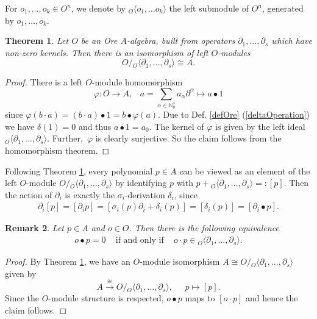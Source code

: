 \documentclass[a4paper,10pt]{article}
\newtheorem{Th}{Theorem}[section]
\newtheorem{remark}[Th]{Remark}
\theoremstyle{nonumberplain}
\newtheorem{proof}{Proof}
\newcommand{\N}{\mathbb{N}}
\begin{document}
For $o_1, \dots, o_k \in O^{n}$, we denote by ${}_O \langle o_1, \dots o_k \rangle$ the left submodule of $O^n$, generated by $o_1, \dots, o_k$.
\begin{Th}\label{IsoOrePoly}
Let $O$ be an Ore $A$-algebra, built from operators $\partial_1, \dots, \partial_s$ which have non-zero kernels. Then there is an isomorphism of left $O$-modules 
$$ O/ {}_O \langle \partial_1, \dots, \partial_s \rangle \cong A. $$
\end{Th}
\begin{proof}
There is a left $O$-module homomorphism 
$$
\varphi : O \rightarrow A, \;\;\; a=\sum_{\alpha \in \N_0^s} a_{\alpha} \partial^\alpha \mapsto a \bullet 1 
$$
since $\varphi(b\cdot a) = (b\cdot a) \bullet 1= b\bullet \varphi(a)$. 
Due to Def. \ref{defOre} (\ref{deltaOperation}) we have $\delta(1)=0$ and thus $a \bullet 1=a_0$. 
The kernel of $\varphi$ is given by the left ideal 
${}_{O} \langle \partial_1, \dots, \partial_s \rangle $. Further,~$\varphi$ 
is clearly surjective. So the claim follows from the homomorphism theorem. 
\end{proof}

Following Theorem \ref{IsoOrePoly}, every polynomial $p \in A$ can be 
viewed as an element of the left $O$-module 
$O / {}_O \langle \partial_1, \dots, \partial_s \rangle$ by identifying 
$p$ with $p + {}_{O} \langle \partial_1, \dots, \partial_s \rangle=:[p]$. Then the 
action of $\partial_i$ is exactly the $\sigma_i$-derivation $\delta_i$, since 
\begin{eqnarray*}
\partial_i [p] = [ \partial_i p] = [ \sigma_i(p) \partial_i + \delta_i(p)] = 
[\delta_i(p)] = [\partial_i \bullet p].
\end{eqnarray*}

\begin{remark}\label{ann}
Let $p \in A$ and $o \in O$. Then there is the following equivalence
\begin{eqnarray*} 
o \bullet p =0 \;\;\; \mbox{ if and only if } \;\;\; 
o \cdot p \in {}_{O} \langle \partial_1, \dots, \partial_s \rangle.
\end{eqnarray*}
\end{remark}
\begin{proof}
By Theorem \ref{IsoOrePoly}, we have an $O$-module isomorphism 
$A \!\cong\! O / {}_O \langle \partial_1, \dots, \partial_s \rangle$ given by 
$$
A \stackrel{\cong}{\longrightarrow} O / 
{}_O \langle \partial_1, \dots, \partial_s \rangle, \;\;\;\;\;  p \mapsto [p].
$$
Since the $O$-module structure is respected, 
$o \bullet p$ maps to $[o \cdot p]$ and hence
the claim follows. 
\end{proof}
\end{document}

